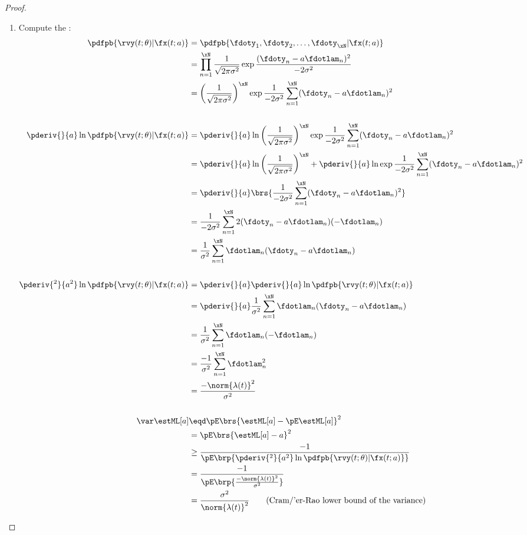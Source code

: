 \begin{proof}
\begin{enumerate}
\item Compute the :
\begin{align*}
   \pdfpb{\rvy(t;\theta)|\fx(t; a)}
     &=  \pdfpb{\fdoty_1, \fdoty_2,\ldots,\fdoty_{\xN}|\fx(t; a)}
   \\&=  \prod_{n=1}^\xN \frac{1}{\sqrt{2\pi\sigma^2}}
          \exp{\frac{(\fdoty_n- a\fdotlam_n)^2}{-2\sigma^2}}
   \\&=  \left(\frac{1}{\sqrt{2\pi\sigma^2}}\right)^\xN
          \exp{\frac{1}{-2\sigma^2} \sum_{n=1}^\xN (\fdoty_n- a\fdotlam_n)^2}
\\
\\
   \pderiv{}{a}\ln\pdfpb{\rvy(t;\theta)|\fx(t; a)}
     &=  \pderiv{}{a}\ln
          \left(\frac{1}{\sqrt{2\pi\sigma^2}}\right)^\xN
          \exp{\frac{1}{-2\sigma^2} \sum_{n=1}^\xN (\fdoty_n- a\fdotlam_n)^2}
   \\&=  \pderiv{}{a}\ln
          \left(\frac{1}{\sqrt{2\pi\sigma^2}}\right)^\xN
       +  \pderiv{}{a}\ln
          \exp{\frac{1}{-2\sigma^2} \sum_{n=1}^\xN (\fdoty_n- a\fdotlam_n)^2}
   \\&=  \pderiv{}{a}
          \brs{\frac{1}{-2\sigma^2} \sum_{n=1}^\xN (\fdoty_n- a\fdotlam_n)^2}
   \\&=  \frac{1}{-2\sigma^2} \sum_{n=1}^\xN 2(\fdoty_n- a\fdotlam_n)(- \fdotlam_n)
   \\&=  \frac{1}{\sigma^2} \sum_{n=1}^\xN \fdotlam_n(\fdoty_n- a\fdotlam_n)
\\
\\
   \pderiv{^2}{a^2}\ln\pdfpb{\rvy(t;\theta)|\fx(t; a)}
     &=  \pderiv{}{a}\pderiv{}{a}\ln\pdfpb{\rvy(t;\theta)|\fx(t; a)}
   \\&=  \pderiv{}{a}
          \frac{1}{\sigma^2} \sum_{n=1}^\xN \fdotlam_n(\fdoty_n- a\fdotlam_n)
   \\&=  \frac{1}{\sigma^2} \sum_{n=1}^\xN \fdotlam_n(-\fdotlam_n)
   \\&=  \frac{-1}{\sigma^2} \sum_{n=1}^\xN \fdotlam_n^2
   \\&=  \frac{-\norm{\lambda(t)}^2}{\sigma^2}
\\
\\
   \var\estML[a]
     &\eqd \pE\brs{\estML[a]-\pE\estML[a]}^2
   \\&=    \pE\brs{\estML[a]- a}^2
   \\&\ge  \frac{-1}{\pE\brp{\pderiv{^2}{ a^2} \ln \pdfpb{\rvy(t;\theta)|\fx(t; a)}}}
   \\&=    \frac{-1}{\pE\brp{\frac{-\norm{\lambda(t)}^2}{\sigma^2}}}
   \\&=    \frac{\sigma^2}{\norm{\lambda(t)}^2}
     \qquad\text{(Cram/'er-Rao lower bound of the variance)}
\end{align*}


\end{enumerate}
\end{proof}
